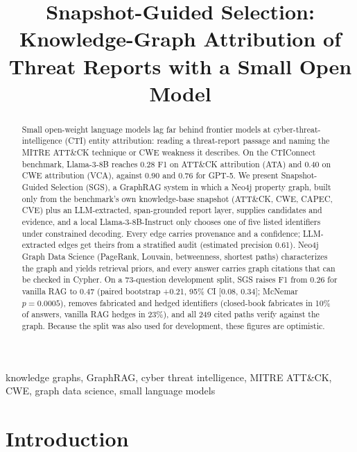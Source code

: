 \documentclass[conference]{IEEEtran}
\begin{document}
\title{Snapshot-Guided Selection: Knowledge-Graph Attribution of Threat Reports with a Small Open Model}

\author{
}

\maketitle

\begin{abstract}
Small open-weight language models lag far behind frontier models at cyber-threat-intelligence (CTI) entity attribution: reading a threat-report passage and naming the MITRE ATT\&CK technique or CWE weakness it describes. On the CTIConnect benchmark, Llama-3-8B reaches 0.28 F1 on ATT\&CK attribution (ATA) and 0.40 on CWE attribution (VCA), against 0.90 and 0.76 for GPT-5. We present Snapshot-Guided Selection (SGS), a GraphRAG system in which a Neo4j property graph, built only from the benchmark's own knowledge-base snapshot (ATT\&CK, CWE, CAPEC, CVE) plus an LLM-extracted, span-grounded report layer, supplies candidates and evidence, and a local Llama-3-8B-Instruct only chooses one of five listed identifiers under constrained decoding. Every edge carries provenance and a confidence; LLM-extracted edges get theirs from a stratified audit (estimated precision 0.61). Neo4j Graph Data Science (PageRank, Louvain, betweenness, shortest paths) characterizes the graph and yields retrieval priors, and every answer carries graph citations that can be checked in Cypher. On a 73-question development split, SGS raises F1 from 0.26 for vanilla RAG to 0.47 (paired bootstrap +0.21, 95\% CI [0.08, 0.34]; McNemar $p=0.0005$), removes fabricated and hedged identifiers (closed-book fabricates in 10\% of answers, vanilla RAG hedges in 23\%), and all 249 cited paths verify against the graph. Because the split was also used for development, these figures are optimistic.
\end{abstract}

\begin{IEEEkeywords}
knowledge graphs, GraphRAG, cyber threat intelligence, MITRE ATT\&CK, CWE, graph data science, small language models
\end{IEEEkeywords}

\section{Introduction}
\end{document}
